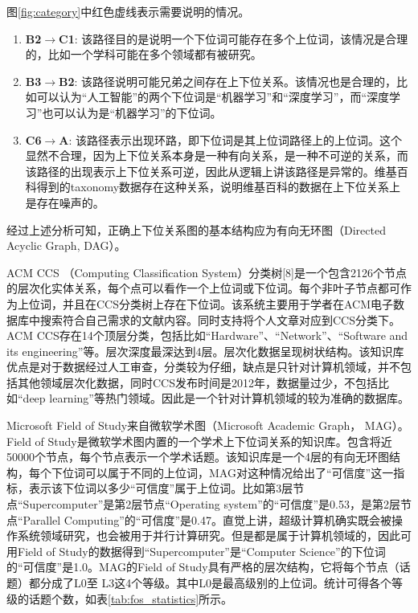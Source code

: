 图\ref{fig:category}中红色虚线表示需要说明的情况。

\begin{enumerate}[label=\arabic*)]
	\item \textbf{B2$\rightarrow$C1}: 该路径目的是说明一个下位词可能存在多个上位词，该情况是合理的，比如一个学科可能在多个领域都有被研究。
	\item \textbf{B3$\rightarrow$B2}: 该路径说明可能兄弟之间存在上下位关系。该情况也是合理的，比如可以认为“人工智能”的两个下位词是“机器学习”和“深度学习”，而“深度学习”也可以认为是“机器学习”的下位词。
	\item \textbf{C6$\rightarrow$A}: 该路径表示出现环路，即下位词是其上位词路径上的上位词。这个显然不合理，因为上下位关系本身是一种有向关系，是一种不可逆的关系，而该路径的出现表示上下位关系可逆，因此从逻辑上讲该路径是异常的。维基百科得到的taxonomy数据存在这种关系，说明维基百科的数据在上下位关系上是存在噪声的。
\end{enumerate}


经过上述分析可知，正确上下位关系图的基本结构应为有向无环图（Directed Acyclic Graph, DAG）。

ACM CCS （Computing Classification System）分类树[8]是一个包含2126个节点的层次化实体关系，每个点可以看作一个上位词或下位词。每个非叶子节点都可作为上位词，并且在CCS分类树上存在下位词。该系统主要用于学者在ACM电子数据库中搜索符合自己需求的文献内容。同时支持将个人文章对应到CCS分类下。ACM CCS存在14个顶层分类，包括比如“Hardware”、“Network”、“Software and its engineering”等。层次深度最深达到4层。层次化数据呈现树状结构。该知识库优点是对于数据经过人工审查，分类较为仔细，缺点是只针对计算机领域，并不包括其他领域层次化数据，同时CCS发布时间是2012年，数据量过少，不包括比如“deep learning”等热门领域。因此是一个针对计算机领域的较为准确的数据库。

Microsoft Field of Study来自微软学术图（Microsoft Academic Graph， MAG）。Field of Study是微软学术图内置的一个学术上下位词关系的知识库。包含将近50000个节点，每个节点表示一个学术话题。该知识库是一个4层的有向无环图结构，每个下位词可以属于不同的上位词，MAG对这种情况给出了“可信度”这一指标，表示该下位词以多少“可信度”属于上位词。比如第3层节点“Supercomputer”是第2层节点“Operating system”的“可信度”是0.53，是第2层节点“Parallel Computing”的“可信度”是0.47。直觉上讲，超级计算机确实既会被操作系统领域研究，也会被用于并行计算研究。但是都是属于计算机领域的，因此可用Field of Study的数据得到“Supercomputer”是“Computer Science”的下位词的“可信度”是1.0。MAG的Field of Study具有严格的层次结构，它将每个节点（话题）都分成了L0至 L3这4个等级。其中L0是最高级别的上位词。统计可得各个等级的话题个数，如表\ref{tab:fos_statistics}所示。


